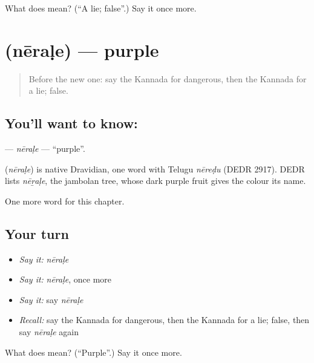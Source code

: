 \begin{tcolorbox}[breakable,colback=teal!4,colframe=teal!35!black,title={Before you move on}]
What does  mean? (\textquotedblleft{}A lie; false\textquotedblright{}.) Say it once more.
\end{tcolorbox}
\section[\texorpdfstring{\kn{ನೇರಳೆ} (nēraḷe)}{ನೇರಳೆ (nēraḷe)}]{ (nēraḷe) — purple}

\label{lesson:KA-C144-nerale}



\begin{quote}
Before the new one: say the Kannada for dangerous, then the Kannada for a lie; false.
\end{quote}

\subsection*{You'll want to know: }
\textbf{} — \emph{nēraḷe} — \textquotedblleft{}purple\textquotedblright{}.

\begin{cousinweb}
\textbf{} (\emph{nēraḷe}) is native Dravidian, one word with Telugu \emph{nēreḍu} (DEDR 2917). DEDR lists \emph{nēṟaḷe}, the jambolan tree, whose dark purple fruit gives the colour its name.
\end{cousinweb}

\begin{grammarlens}[title={What you've built}]
One more word for this chapter.
\end{grammarlens}

\subsection*{Your turn}
\begin{itemize}
\raggedright
  \item \emph{Say it:} \emph{nēraḷe}
  \item \emph{Say it:} \emph{nēraḷe}, once more
  \item \emph{Say it:} say \emph{nēraḷe}
  \item \emph{Recall:} say the Kannada for dangerous, then the Kannada for a lie; false, then say \emph{nēraḷe} again
\end{itemize}

\begin{tcolorbox}[breakable,colback=teal!4,colframe=teal!35!black,title={Before you move on}]
What does  mean? (\textquotedblleft{}Purple\textquotedblright{}.) Say it once more.
\end{tcolorbox}
